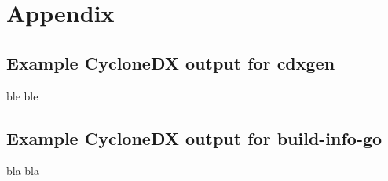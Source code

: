 \appendix
\section{Appendix}

\subsection{Example CycloneDX output for \textbf{cdxgen}}

ble ble

\subsection{Example CycloneDX output for \textbf{build-info-go}}

bla bla
